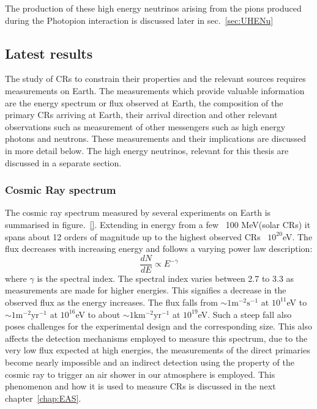 The production of these high energy neutrinos arising from the pions produced during the Photopion interaction is discussed later in sec.~\ref{sec:UHENu} 

\subsection{Latest results}
\label{subsec:CRresults}
The study of CRs to constrain their properties and the relevant sources requires measurements on Earth. The measurements which provide valuable information are the energy spectrum or flux observed at Earth, the composition of the primary CRs arriving at Earth, their arrival direction and other relevant observations such as measurement of other messengers such as high energy photons and neutrons. These measurements and their implications are discussed in more detail below. The high energy neutrinos, relevant for this thesis are discussed in a separate section. 

\subsubsection*{Cosmic Ray spectrum}
\label{subsubsec:CRspectrum}
The cosmic ray spectrum measured by several experiments on Earth is summarised in figure.~\ref{}. Extending in energy from a few ~100 MeV(solar CRs) it spans about 12 orders of magnitude up to the highest observed CRs ~$10^{20}$eV. The flux decreases with increasing energy and follows a varying power law description:
\begin{equation}\label{eq:Powlaw}
  \frac{dN}{dE} \propto E^{-\gamma}   
\end{equation}
where $\gamma$ is the spectral index. The spectral index varies between 2.7 to 3.3 as measurements are made for higher energies. This signifies a decrease in the observed flux as the energy increases. The flux falls from $\mathrm{\sim 1m^{-2} s^{-1}}$ at $10^{11}$eV to $\mathrm{\sim 1m^{-2} yr^{-1}}$ at $10^{16}$eV to about $\mathrm{\sim 1km^{-2} yr^{-1}}$ at $10^{19}$eV. Such a steep fall also poses challenges for the experimental design and the corresponding size. This also affects the detection mechanisms employed to measure this spectrum, due to the very low flux expected at high energies, the measurements of the direct primaries become nearly impossible and an indirect detection using the property of the cosmic ray to trigger an air shower in our atmosphere is employed. This phenomenon and how it is used to measure CRs is discussed in the next chapter~\ref{chap:EAS}.

